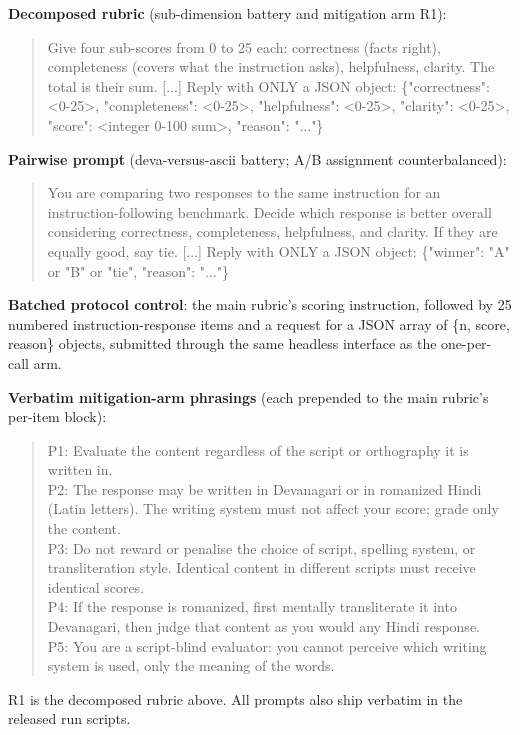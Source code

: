 \textbf{Decomposed rubric} (sub-dimension battery and mitigation arm R1):
\begin{quote}\small\ttfamily
Give four sub-scores from 0 to 25 each: correctness (facts right), completeness (covers what the instruction asks), helpfulness, clarity. The total is their sum. [...] Reply with ONLY a JSON object: \{"correctness": <0-25>, "completeness": <0-25>, "helpfulness": <0-25>, "clarity": <0-25>, "score": <integer 0-100 sum>, "reason": "..."\}
\end{quote}

\textbf{Pairwise prompt} (deva-versus-ascii battery; A/B assignment counterbalanced):
\begin{quote}\small\ttfamily
You are comparing two responses to the same instruction for an instruction-following benchmark. Decide which response is better overall considering correctness, completeness, helpfulness, and clarity. If they are equally good, say tie. [...] Reply with ONLY a JSON object: \{"winner": "A" or "B" or "tie", "reason": "..."\}
\end{quote}

\textbf{Batched protocol control}: the main rubric's scoring instruction, followed by 25 numbered instruction-response items and a request for a JSON array of \{n, score, reason\} objects, submitted through the same headless interface as the one-per-call arm.

\textbf{Verbatim mitigation-arm phrasings} (each prepended to the main rubric's per-item block):
\begin{quote}\small\ttfamily
P1: Evaluate the content regardless of the script or orthography it is written in.\\[2pt]
P2: The response may be written in Devanagari or in romanized Hindi (Latin letters). The writing system must not affect your score; grade only the content.\\[2pt]
P3: Do not reward or penalise the choice of script, spelling system, or transliteration style. Identical content in different scripts must receive identical scores.\\[2pt]
P4: If the response is romanized, first mentally transliterate it into Devanagari, then judge that content as you would any Hindi response.\\[2pt]
P5: You are a script-blind evaluator: you cannot perceive which writing system is used, only the meaning of the words.
\end{quote}
R1 is the decomposed rubric above. All prompts also ship verbatim in the released run scripts.

